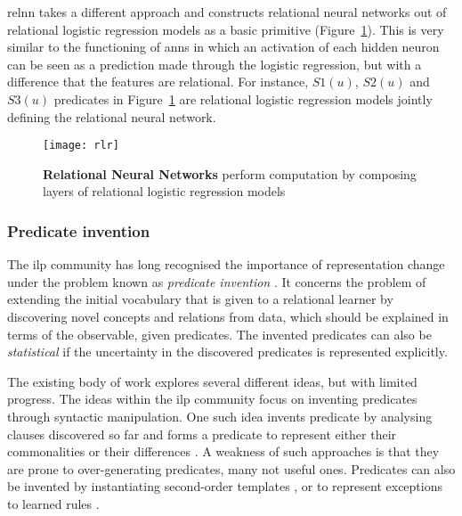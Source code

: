 \gls{relnn} takes a different approach and constructs relational neural networks out of relational logistic regression models as a basic primitive (Figure~\ref{fig:relnn}).
This is very similar to the functioning of \gls{ann}s in which an activation of each hidden neuron can be seen as a prediction made through the logistic regression, but with a difference that the features are relational.
For instance, $S1(u)$, $S2(u)$ and $S3(u)$ predicates in Figure~\ref{fig:relnn} are relational logistic regression models jointly defining the relational neural network.



\begin{figure}
	\centering
	\texttt{[image: rlr]}
	\caption[Relational Neural Networks]{\textbf{Relational Neural Networks} perform computation by composing layers of relational logistic regression models\label{fig:relnn}}
\end{figure}




\subsubsection{Predicate invention}

The \gls{ilp} community has long recognised the importance of representation change under the problem known as \textit{predicate invention} \cite{Kramer1995}.
It concerns the problem of extending the initial vocabulary that is given to a relational learner by discovering novel concepts and relations from data, which should be explained in terms of the observable, given predicates.
The invented predicates can also be \textit{statistical} if the uncertainty in the discovered predicates is represented explicitly.


The existing body of work explores several different ideas, but with limited progress.
The ideas within the \gls{ilp} community focus on inventing predicates through syntactic manipulation.
One such idea invents predicate by analysing clauses discovered so far and forms a predicate to represent either their commonalities \cite{Wogulis1989} or their differences \cite{MuggletonBu88}.
A weakness of such approaches is that they are prone to over-generating predicates, many not useful ones.
Predicates can also be invented by instantiating second-order templates \cite{Silverstein91}, or to represent exceptions to learned rules \cite{Srinivasan92}.

